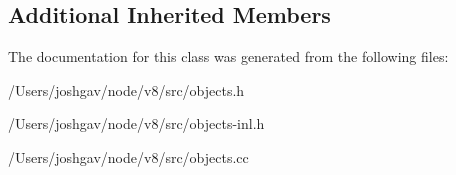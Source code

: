 \subsection*{Additional Inherited Members}


The documentation for this class was generated from the following files\+:\begin{DoxyCompactItemize}
\item 
/\+Users/joshgav/node/v8/src/objects.\+h\item 
/\+Users/joshgav/node/v8/src/objects-\/inl.\+h\item 
/\+Users/joshgav/node/v8/src/objects.\+cc\end{DoxyCompactItemize}
